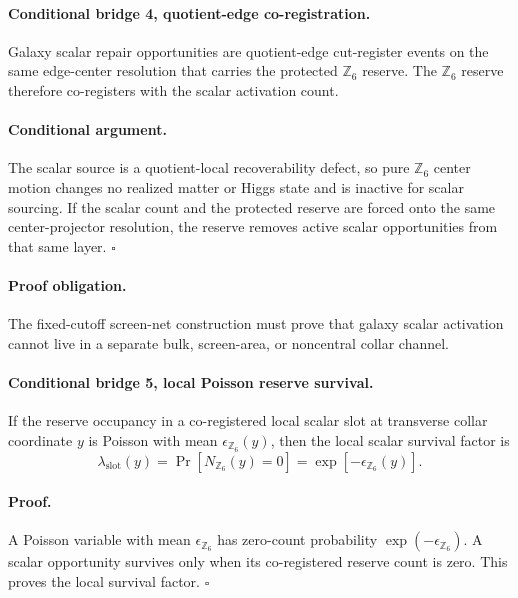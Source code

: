 \documentclass[11pt]{article}
\newcommand{\Zsix}{\mathbb Z_6}
\begin{document}
\paragraph{Conditional bridge 4, quotient-edge co-registration.}
Galaxy scalar repair opportunities are quotient-edge cut-register events on
the same edge-center resolution that carries the protected \(\Zsix\) reserve.
The \(\Zsix\) reserve therefore co-registers with the scalar activation count.

\paragraph{Conditional argument.}
The scalar source is a quotient-local recoverability defect, so pure
\(\Zsix\) center motion changes no realized matter or Higgs state and is
inactive for scalar sourcing.  If the scalar count and the protected reserve
are forced onto the same center-projector resolution, the reserve removes
active scalar opportunities from that same layer. \(\square\)

\paragraph{Proof obligation.}
The fixed-cutoff screen-net construction must prove that galaxy scalar
activation cannot live in a separate bulk, screen-area, or noncentral collar
channel.

\paragraph{Conditional bridge 5, local Poisson reserve survival.}
If the reserve occupancy in a co-registered local scalar slot at transverse
collar coordinate \(y\) is Poisson with mean \(\epsilon_{\Zsix}(y)\), then the
local scalar survival factor is
\begin{equation}
  \lambda_{\mathrm{slot}}(y)
  =
  \Pr[N_{\Zsix}(y)=0]
  =
  \exp[-\epsilon_{\Zsix}(y)].
  \label{eq:z6localsurvival}
\end{equation}

\paragraph{Proof.}
A Poisson variable with mean \(\epsilon_{\Zsix}\) has zero-count probability
\(\exp(-\epsilon_{\Zsix})\).  A scalar opportunity survives only when its
co-registered reserve count is zero.  This proves the local survival factor.
\(\square\)
\end{document}
